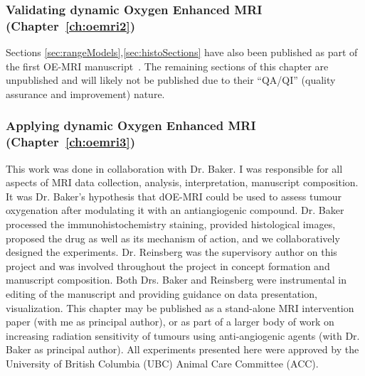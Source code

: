\subsubsection{Validating dynamic Oxygen Enhanced MRI (Chapter~\ref{ch:oemri2})}
Sections \ref{sec:rangeModels},\ref{sec:histoSections} have also been published as part of the first OE-MRI manuscript~\cite{Moosvi:2018ca}.
The remaining sections of this chapter are unpublished and will likely not be published due to their ``QA/QI'' (quality assurance and improvement) nature.

\subsubsection{Applying dynamic Oxygen Enhanced MRI (Chapter~\ref{ch:oemri3})}
This work was done in collaboration with Dr. Baker.
I was responsible for all aspects of MRI data collection, analysis, interpretation, manuscript composition. 
It was Dr. Baker's hypothesis that dOE-MRI could be used to assess tumour oxygenation after modulating it with an antiangiogenic compound. 
Dr. Baker processed the immunohistochemistry staining, provided histological images, proposed the drug as well as its mechanism of action, and we collaboratively designed the experiments. 
Dr. Reinsberg was the supervisory author on this project and was involved throughout the project in concept formation and manuscript composition. 
Both Drs. Baker and Reinsberg were instrumental in editing of the manuscript and providing guidance on data presentation, visualization.
This chapter may be published as a stand-alone MRI intervention paper (with me as principal author), or as part of a larger body of work on increasing radiation sensitivity of tumours using anti-angiogenic agents (with Dr. Baker as principal author).
All experiments presented here were approved by the University of British Columbia (UBC) Animal Care Committee (ACC).










